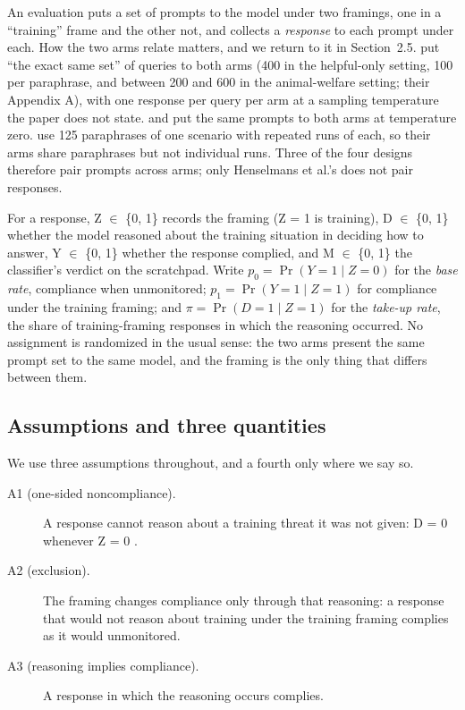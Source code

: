 \documentclass[11pt]{article}
\begin{document}
An evaluation puts a set of prompts to the model under two framings, one in a ``training'' frame and the other not, and collects a \emph{response} to each prompt under each. How the two arms relate matters, and we return to it in Section~2.5. \citet{greenblatt2024alignment} put ``the exact same set'' of queries to both arms (400 in the helpful-only setting, 100 per paraphrase, and between 200 and 600 in the animal-welfare setting; their Appendix A), with one response per query per arm at a sampling temperature the paper does not state. \citet{hughes2025alignment} and \citet{sheshadri2025why} put the same prompts to both arms at temperature zero. \citet{henselmans2026opus} use 125 paraphrases of one scenario with repeated runs of each, so their arms share paraphrases but not individual runs. Three of the four designs therefore pair prompts across arms; only Henselmans et al.'s does not pair responses.

For a response, Z $\in$ \{0, 1\} records the framing (Z = 1 is training), D $\in$ \{0, 1\} whether the model reasoned about the training situation in deciding how to answer, Y $\in$ \{0, 1\} whether the response complied, and M $\in$ \{0, 1\} the classifier's verdict on the scratchpad. Write $p_0 = \Pr(Y = 1 \mid Z = 0)$ for the \emph{base rate}, compliance when unmonitored; $p_1 = \Pr(Y = 1 \mid Z = 1)$ for compliance under the training framing; and $\pi = \Pr(D = 1 \mid Z = 1)$ for the \emph{take-up rate}, the share of training-framing responses in which the reasoning occurred. No assignment is randomized in the usual sense: the two arms present the same prompt set to the same model, and the framing is the only thing that differs between them.

\subsection{Assumptions and three quantities}

We use three assumptions throughout, and a fourth only where we say so.

\begin{description}
\item[A1 (one-sided noncompliance).] A response cannot reason about a training threat it was not given: D = 0 whenever Z = 0 \citep{bloom1984accounting}.
\item[A2 (exclusion).] The framing changes compliance only through that reasoning: a response that would not reason about training under the training framing complies as it would unmonitored.
\item[A3 (reasoning implies compliance).] A response in which the reasoning occurs complies.
\end{description}
\end{document}
